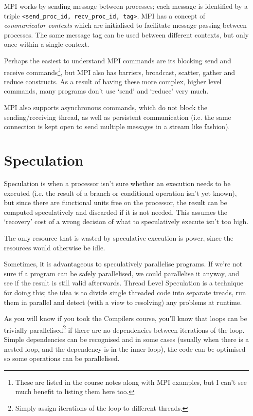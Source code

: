MPI works by sending message between processes; each message is
identified by a triple \texttt{<send\_proc\_id, recv\_proc\_id,
tag>}. MPI has a concept of \textit{communicator contexts} which are
initialised to facilitate message passing between processes. The same
message tag can be used between different contexts, but only once
within a single context.

Perhaps the easiest to understand MPI commands are its blocking send
and receive commands\footnote{These are listed in the course notes
along with MPI examples, but I can't see much benefit to listing them
here too.}, but MPI also has barriers, broadcast, scatter, gather and
reduce constructs. As a result of having these more complex, higher
level commands, many programs don't use `send' and `reduce' very much.

MPI also supports asynchronous commands, which do not block the
sending/receiving thread, as well as persistent communication (i.e. the
same connection is kept open to send multiple messages in a stream
like fashion).


\section{Speculation}

Speculation is when a processor isn't sure whether an execution needs
to be executed (i.e. the result of a branch or conditional operation
isn't yet known), but since there are functional units free on the
processor, the result can be computed speculatively and discarded if
it is not needed. This assumes the `recovery' cost of a wrong decision
of what to speculatively execute isn't too high.

The only resource that is wasted by speculative execution is power,
since the resources would otherwise be idle.

Sometimes, it is advantageous to speculatively parallelise
programs. If we're not sure if a program can be safely parallelised,
we could parallelise it anyway, and see if the result is still valid
afterwards. Thread Level Speculation is a technique for doing this;
the idea is to divide single threaded code into separate treads, run
them in parallel and detect (with a view to resolving) any problems at
runtime.

As you will know if you took the Compilers course, you'll know that
loops can be trivially parallelised\footnote{Simply assign iterations
of the loop to different threads.} if there are no dependencies
between iterations of the loop. Simple dependencies can be recognised
and in some cases (usually when there is a nested loop, and the
dependency is in the inner loop), the code can be optimised so some
operations can be parallelised.

